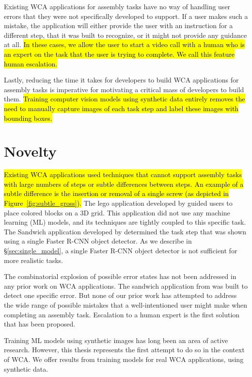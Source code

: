 Existing WCA applications for assembly tasks have no way of handling user
errors that they were not specifically developed to support.
If a user makes such a mistake, the application will either provide
the user with an instruction for a different step, that it was built to
recognize, or it might not provide any guidance at all.
\hl{In these cases, we allow the user to start a video call with a human who is
  an expert on the task that the user is trying to complete.
  We call this feature human escalation.
}

Lastly, reducing the time it takes for developers to build WCA applications for
assembly tasks is imperative for motivating a critical mass of developers to
build them.
\hl{
  Training computer vision models using synthetic data entirely removes the need
  to manually capture
  images of each task step and label these images with bounding boxes.
}

\section{Novelty}

\hl{
  Existing WCA applications used techniques that cannot support assembly tasks
  with large numbers of steps or subtle differences between steps.
  An example of a subtle difference is the insertion or removal of a single
  screw (as depicted in Figure~{\ref{fig:subtle_gross}}).
}
The lego application developed by \citet{chen2017} guided users to place colored
blocks on a 3D grid.
This application did not use any machine learning (ML) models, and its
techniques are tightly coupled to this specific task.
The Sandwich application developed by \citet{chen2017} determined the task step
that was shown using a single Faster R-CNN object detector.
As we describe in \S\ref{sec:single_model}, a single Faster R-CNN object
detector is not sufficient for more realistic tasks.

The combinatorial explosion of possible error states has not been addressed in
any prior work on WCA applications.
The sandwich application from \citet{chen2017} was built to detect one specific
error.
But none of our prior work has attempted to address the wide range of possible
mistakes that a well-intentioned user might make when completing an assembly
task.
Escalation to a human expert is the first solution that has been proposed.

Training ML models using synthetic images has long been an area of active
research.
However, this thesis represents the first attempt to do so in the context of
WCA.
We offer results from training models for real WCA applications, using synthetic
data.

